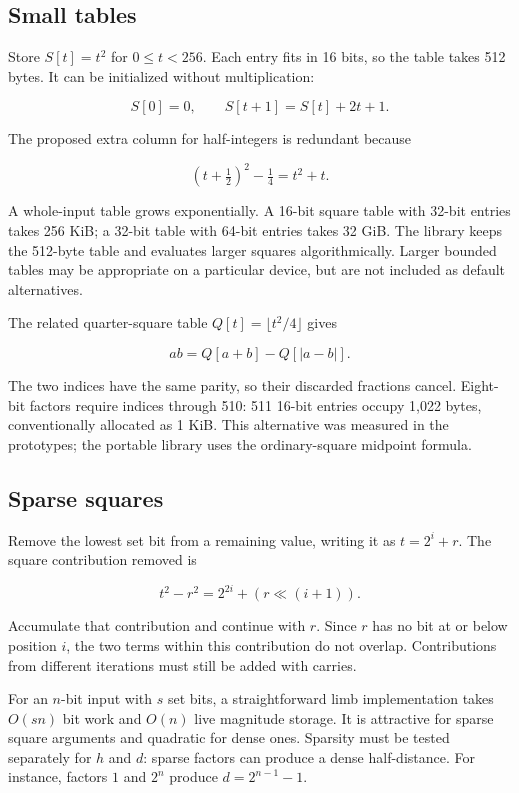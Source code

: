 \documentclass[11pt,a4paper]{article}
\begin{document}
\subsection{Small tables}

Store $S[t]=t^2$ for $0\le t<256$. Each entry fits in 16 bits, so the table takes 512 bytes. It can be initialized without multiplication:

\[
S[0]=0,\qquad S[t+1]=S[t]+2t+1.
\]

The proposed extra column for half-integers is redundant because

\[
(t+\tfrac12)^2-\tfrac14=t^2+t.
\]

A whole-input table grows exponentially. A 16-bit square table with 32-bit entries takes 256 KiB; a 32-bit table with 64-bit entries takes 32 GiB. The library keeps the 512-byte table and evaluates larger squares algorithmically. Larger bounded tables may be appropriate on a particular device, but are not included as default alternatives.

The related quarter-square table $Q[t]=\lfloor t^2/4\rfloor$ gives

\[
ab=Q[a+b]-Q[|a-b|].
\]

The two indices have the same parity, so their discarded fractions cancel. Eight-bit factors require indices through 510: 511 16-bit entries occupy 1,022 bytes, conventionally allocated as 1 KiB. This alternative was measured in the prototypes; the portable library uses the ordinary-square midpoint formula.

\subsection{Sparse squares}

Remove the lowest set bit from a remaining value, writing it as $t=2^i+r$. The square contribution removed is

\[
t^2-r^2=2^{2i}+(r\ll(i+1)).
\]

Accumulate that contribution and continue with $r$. Since $r$ has no bit at or below position $i$, the two terms within this contribution do not overlap. Contributions from different iterations must still be added with carries.

For an $n$-bit input with $s$ set bits, a straightforward limb implementation takes $O(sn)$ bit work and $O(n)$ live magnitude storage. It is attractive for sparse square arguments and quadratic for dense ones. Sparsity must be tested separately for $h$ and $d$: sparse factors can produce a dense half-distance. For instance, factors $1$ and $2^n$ produce $d=2^{n-1}-1$.
\end{document}
